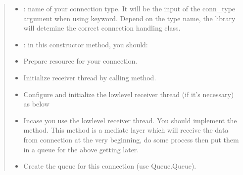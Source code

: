 \documentclass[letterpaper,10pt,english]{sphinxmanual}
\begin{document}
\begin{quote}
\begin{itemize}
\item {} 
\sphinxAtStartPar
{}: name of your connection type. It will be the input of the conn\_type argument when using  keyword. Depend on the type name, the library will detemine the correct connection handling class.

\item {} 
\sphinxAtStartPar
{}: in this constructor method, you should:

\end{itemize}
\begin{itemize}
\item {} 
\sphinxAtStartPar
Prepare resource for your connection.

\item {} 
\sphinxAtStartPar
Initialize receiver thread by calling  method.

\item {} 
\sphinxAtStartPar
Configure and initialize the lowlevel receiver thread (if it’s necessary) as below

\begin{sphinxVerbatim}[commandchars=\\\{\}]
  
   
\end{sphinxVerbatim}

\item {} 
\sphinxAtStartPar
Incase you use the lowlevel receiver thread. You should implement the  method. This method is a mediate layer which will receive the data from connection at the very beginning, do some process then put them in a queue for the  above getting later.

\item {} 
\sphinxAtStartPar
Create the queue for this connection (use Queue.Queue).


\end{itemize}
\end{quote}
\end{document}
